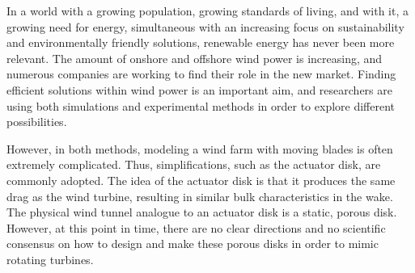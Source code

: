 In a world with a growing population, growing standards of living, and with it, a growing need for energy, simultaneous with an increasing focus on sustainability and environmentally friendly solutions, renewable energy has never been more relevant. The amount of onshore and offshore wind power is increasing, and numerous companies are working to find their role in the new market. Finding efficient solutions within wind power is an important aim, and researchers are using both simulations and experimental methods in order to explore different possibilities. 

However, in both methods, modeling a wind farm with moving blades is often extremely complicated. Thus, simplifications, such as the actuator disk, are commonly adopted. The idea of the actuator disk is that it produces the same drag as the wind turbine, resulting in similar bulk characteristics in the wake. The physical wind tunnel analogue to an actuator disk is a static, porous disk. However, at this point in time, there are no clear directions and no scientific consensus on how to design and make these porous disks in order to mimic rotating turbines.  

